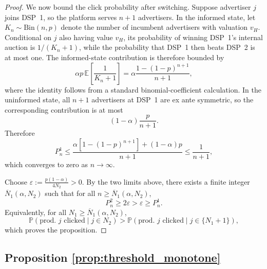 \begin{proof}
\noindent We now bound the click probability after switching. Suppose advertiser $j$ joins DSP~1, so the platform serves $n+1$ advertisers. In the informed state, let $K_n \sim \mathrm{Bin}(n,p)$ denote the number of incumbent advertisers with valuation $v_H$. Conditional on $j$ also having value $v_H$, its probability of winning DSP~1's internal auction is $1/(K_n+1)$, while the probability that DSP~1 then beats DSP~2 is at most one. The informed-state contribution is therefore bounded by
\begin{equation*}
    \alpha p \, \mathbb{E}\!\left[\frac{1}{K_n+1}\right] = \alpha \frac{1-(1-p)^{n+1}}{n+1},
\end{equation*}
where the identity follows from a standard binomial-coefficient calculation. In the uninformed state, all $n+1$ advertisers at DSP~1 are ex ante symmetric, so the corresponding contribution is at most
\begin{equation*}
    (1-\alpha)\frac{p}{n+1}.
\end{equation*}
Therefore
\begin{equation*}
    P_n^{1} \leq \frac{\alpha[1-(1-p)^{n+1}] + (1-\alpha)p}{n+1} \leq \frac{1}{n+1},
\end{equation*}
which converges to zero as $n\to\infty$.

\noindent Choose $\varepsilon := \frac{p(1-\alpha)}{4N_2} > 0$. By the two limits above, there exists a finite integer $\overline{N}_1(\alpha,N_2)$ such that for all $n \geq \overline{N}_1(\alpha,N_2)$,
\begin{equation*}
    P_n^{2} \geq 2\varepsilon > \varepsilon \geq P_n^{1}.
\end{equation*}
Equivalently, for all $N_1 \geq \overline{N}_1(\alpha,N_2)$,
\begin{equation*}
    \mathbb{P}(\text{prod.\ } j \text{ clicked} \mid j \in N_2) > \mathbb{P}(\text{prod.\ } j \text{ clicked} \mid j \in \{N_1+1\}),
\end{equation*}
which proves the proposition.
\end{proof}

\subsection*{Proposition \ref{prop:threshold_monotone}}

